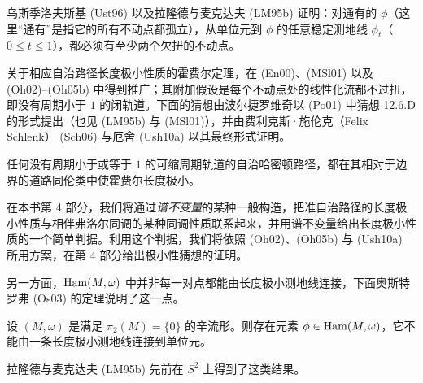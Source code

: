乌斯季洛夫斯基 (Ust96) 以及拉隆德与麦克达夫 (LM95b) 证明：对通有的
$\phi$（这里“通有”是指它的所有不动点都孤立），从单位元到 $\phi$ 的任意稳定测地线 $\phi_t$（$0\leq t\leq1$），都必须有至少两个欠扭的不动点。

关于相应自治路径长度极小性质的霍费尔定理，在 (En00)、(MSl01) 以及 (Oh02)--(Oh05b) 中得到推广；其附加假设是每个不动点处的线性化流都不过扭，即没有周期小于 $1$ 的闭轨道。下面的猜想由波尔捷罗维奇以 (Po01) 中猜想 12.6.D 的形式提出（也见 (LM95b) 与 (MSl01)），并由费利克斯·施伦克（Felix Schlenk） (Sch06) 与厄舍 (Ush10a) 以其最终形式证明。

\begin{theorem}[极小性猜想]\label{thm:minimality-conjecture}
任何没有周期小于或等于 $1$ 的可缩周期轨道的自治哈密顿路径，都在其相对于边界的道路同伦类中使霍费尔长度极小。
\end{theorem}

在本书第 4 部分，我们将通过\emph{谱不变量}的某种一般构造，把准自治路径的长度极小性质与相伴弗洛尔同调的某种同调性质联系起来，并用谱不变量给出长度极小性质的一个简单判据。利用这个判据，我们将依照 (Oh02)、(Oh05b) 与 (Ush10a) 所用方案，在第 4 部分给出极小性猜想的证明。

另一方面，$\operatorname{Ham}(M,\omega)$ 中并非每一对点都能由长度极小测地线连接，下面奥斯特罗弗 (Os03) 的定理说明了这一点。

\begin{theorem}[奥斯特罗弗]\label{thm:ostrover-no-minimizing-geodesic}
设 $(M,\omega)$ 是满足 $\pi_2(M)=\{0\}$ 的辛流形。则存在元素
$\phi\in\operatorname{Ham}(M,\omega)$，它不能由一条长度极小测地线连接到单位元。
\end{theorem}

拉隆德与麦克达夫 (LM95b) 先前在 $S^2$ 上得到了这类结果。
